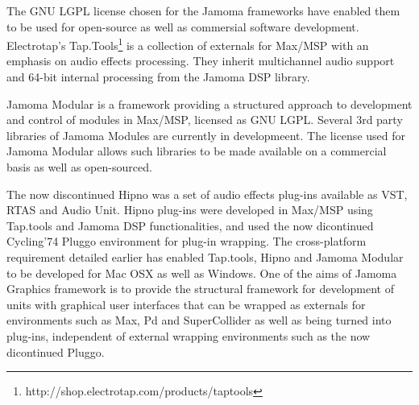 \documentclass[twoside,10pt]{article}
\begin{document}


The GNU LGPL license chosen for the Jamoma frameworks have enabled them to be used for open-source as well as commersial software development.  Electrotap's Tap.Tools\footnote{http://shop.electrotap.com/products/taptools} is a collection of externals for Max/MSP with an emphasis on audio effects processing.  They inherit multichannel audio support and 64-bit internal processing from the Jamoma DSP library.

Jamoma Modular \cite{Place:2006} is a framework providing a structured approach to development and control of modules in Max/MSP, licensed as GNU LGPL. Several 3rd party libraries of Jamoma Modules are currently in developmeent. The license used for Jamoma Modular allows such libraries to be made available on a commercial basis as well as open-sourced.

The now discontinued Hipno\cite{Place:2005} was a set of audio effects plug-ins available as VST, RTAS and Audio Unit. Hipno plug-ins were developed in Max/MSP using Tap.tools and Jamoma DSP functionalities, and used the now dicontinued Cycling'74 Pluggo environment for plug-in wrapping. The cross-platform requirement detailed earlier has enabled Tap.tools, Hipno and Jamoma Modular to be developed for Mac OSX as well as Windows. One of the aims of Jamoma Graphics framework is to provide the structural framework for development of units with graphical user interfaces that can be wrapped as externals for environments such as Max, Pd and SuperCollider as well as being turned into plug-ins, independent of external wrapping environments such as the now dicontinued Pluggo.
\end{document}
